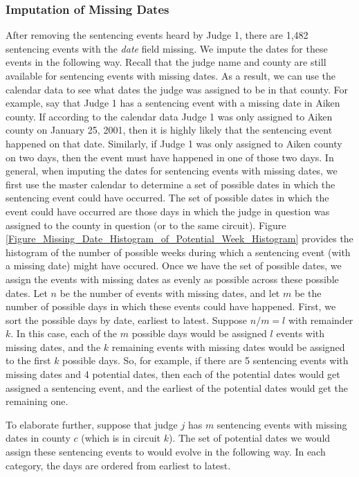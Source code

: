 \documentclass[11pt, oneside]{article}   	%
\theoremstyle{ModifiedStyle}
\begin{document}
    \subsubsection{Imputation of Missing Dates}
      After removing the sentencing events heard by Judge 1, there are 1,482 sentencing events with the \textit{date} field missing. We impute the dates for these events in the following way. Recall that the judge name and county are still available for sentencing events with missing dates. As a result, we can use the calendar data to see what dates the judge was assigned to be in that county. For example, say that Judge 1 has a sentencing event with a missing date in Aiken county. If according to the calendar data Judge 1 was only assigned to Aiken county on January 25, 2001, then it is highly likely that the sentencing event happened on that date. Similarly, if Judge 1 was only assigned to Aiken county on two days, then the event must have happened in one of those two days. In general, when imputing the dates for sentencing events with missing dates, we first use the master calendar to determine a set of possible dates in which the sentencing event could have occurred. The set of possible dates in which the event could have occurred are those days in which the judge in question was assigned to the county in question (or to the same circuit). Figure \ref{Figure_Missing_Date_Histogram_of_Potential_Week_Histogram} provides the histogram of the number of possible weeks during which a sentencing event (with a missing date) might have occured. Once we have the set of possible dates, we assign the events with missing dates as evenly as possible across these possible dates. Let $n$ be the number of events with missing dates, and let $m$ be the number of possible days in which these events could have happened. First, we sort the possible days by date, earliest to latest. Suppose $n/m = l$ with remainder $k$. In this case, each of the $m$ possible days would be assigned $l$ events with missing dates, and the $k$ remaining events with missing dates would be assigned to the first $k$ possible days.  So, for example, if there are 5 sentencing events with missing dates and 4 potential dates, then each of the potential dates would get assigned a sentencing event, and the earliest of the potential dates would get the remaining one.

      To elaborate further, suppose that judge $j$ has $m$ sentencing events with missing dates in county $c$ (which is in circuit $k$). The set of potential dates we would assign these sentencing events to would evolve in the following way. In each category, the days are ordered from earliest to latest.
\end{document}
